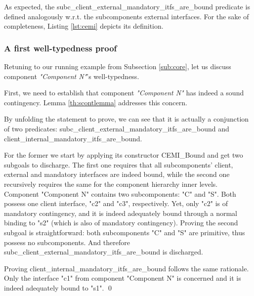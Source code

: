 		  As expected, the \textsf{subc\_client\_external\_mandatory\_itfs\_are\_bound}  predicate is defined analogously
	  w.r.t. the sub\textsf{component}s \textsf{external} \textsf{interface}s. For the sake of completeness,
	  Listing \ref{lst:cemi} depicts its definition.
	  
	   
	
		
\subsubsection{A first well-typedness proof}
	
	Retuning to our running example from Subsection \ref{sub:core}, let us discuss
	\textsf{component} \textit{"Component N"}'s well-typedness.
	
	 First, we need to establish that \textsf{component} \textit{"Component N"} has indeed
	 a sound \textsf{contingency}. Lemma \ref{th:scontlemma} addresses this concern.
	 	 
		
\begin{lemma} \label{th:scontlemma} 
			
	
	By unfolding the statement to prove, we can see that it is actually a 
	conjunction of two predicates: subc\_client\_external\_mandatory\_itfs\_are\_bound 
	and client\_internal\_mandatory\_itfs\_are\_bound. 
	
		 For the former we start by applying its constructor \textsf{CEMI\_Bound} and
	get two subgoals to discharge. The first one requires that all subcomponents'
	client, external and mandatory interfaces are indeed bound, 
	while the second one recursively requires the same for the component hierarchy 
	inner levels. 
		Component "Component N" contains two subcomponents: "C" and "S". Both
	possess one client interface, "c2" and "c3", respectively. Yet, only "c2" is of mandatory 
	contingency, and it is indeed adequately bound through a normal binding
	to "s2" (which is also of mandatory contingency). Proving the second subgoal 
	is straightforward: both subcomponents "C" and "S" are primitive, thus possess no 
	subcomponents. And therefore subc\_client\_external\_mandatory\_itfs\_are\_bound 
	is discharged.
	
		Proving client\_internal\_mandatory\_itfs\_are\_bound follows the same rationale.
	Only the interface "c1" from component "Component N" is concerned and it is indeed
	adequately bound to "s1". \qed
\end{lemma}

